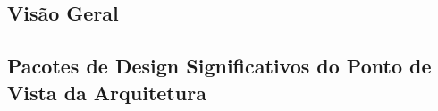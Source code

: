 
\subsection{Visão Geral}

\subsection{Pacotes de Design Significativos do Ponto de Vista da Arquitetura}

